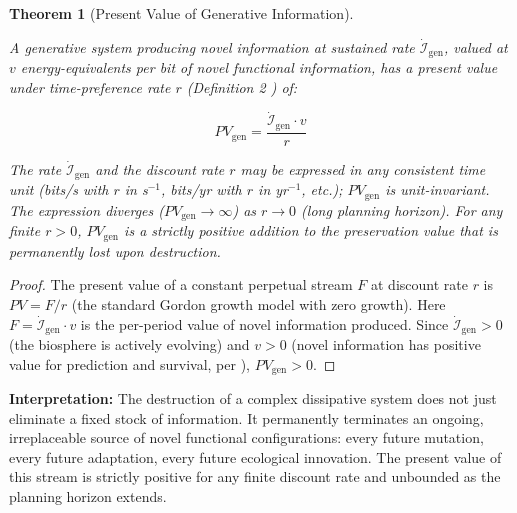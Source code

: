 \documentclass[11pt]{article}
\theoremstyle{plain}
\newtheorem{theorem}{Theorem}
\theoremstyle{definition}
\theoremstyle{remark}
\begin{document}
\begin{theorem}[Present Value of Generative Information]
\label{thm-present-value-generative-info}

A generative system producing novel information at sustained rate $\dot{\mathcal{I}}_{\text{gen}}$, valued at $v$ energy-equivalents per bit of novel functional information, has a present value under time-preference rate $r$ (Definition 2 \citep{TC-V}) of:

$$PV_{\text{gen}} = \frac{\dot{\mathcal{I}}_{\text{gen}} \cdot v}{r}$$

The rate $\dot{\mathcal{I}}_{\text{gen}}$ and the discount rate $r$ may be expressed in any consistent time unit (bits/s with $r$ in s$^{-1}$, bits/yr with $r$ in yr$^{-1}$, etc.); $PV_{\text{gen}}$ is unit-invariant. The expression diverges ($PV_{\text{gen}} \to \infty$) as $r \to 0$ (long planning horizon). For any finite $r > 0$, $PV_{\text{gen}}$ is a strictly positive addition to the preservation value that is permanently lost upon destruction.
\end{theorem}

\begin{proof}
The present value of a constant perpetual stream $F$ at discount rate $r$ is $PV = F/r$ (the standard Gordon growth model with zero growth). Here $F = \dot{\mathcal{I}}_{\text{gen}} \cdot v$ is the per-period value of novel information produced. Since $\dot{\mathcal{I}}_{\text{gen}} > 0$ (the biosphere is actively evolving) and $v > 0$ (novel information has positive value for prediction and survival, per \citep{TC-II,TC-V}), $PV_{\text{gen}} > 0$.
\end{proof}

\textbf{Interpretation:} The destruction of a complex dissipative system
does not just eliminate a fixed stock of information. It permanently
terminates an ongoing, irreplaceable source of novel functional
configurations: every future mutation, every future adaptation, every
future ecological innovation. The present value of this stream is
strictly positive for any finite discount rate and unbounded as the
planning horizon extends.
\end{document}
